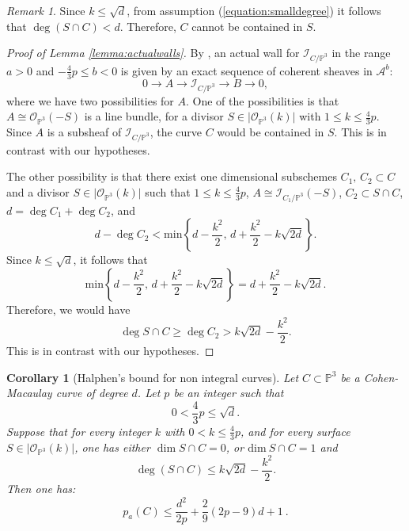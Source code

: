 \documentclass[9pt,a4paper]{amsart}
\theoremstyle{plain}
\newtheorem{corollary}[theorem]{Corollary}
\theoremstyle{definition}
\theoremstyle{remark}
\newtheorem{remark}[theorem]{Remark}
\begin{document}
\begin{remark}
Since $k\leq \sqrt{d}$, from assumption (\ref{equation:smalldegree})
it follows that $\deg(S\cap C)<d$. Therefore, $C$ cannot be
contained in $S$.
\end{remark}


\begin{proof}[Proof of Lemma \ref{lemma:actualwalls}]
By \cite[Proposition 3.2]{Liu}, an actual wall for
$\mathcal I_{C/\mathbb{P}^3} $ in the range $a> 0$ and $ - \frac{4}{3}p \le b
< 0$ is given by an exact sequence of coherent sheaves in $\mathcal
A^b$:
\begin{equation*}
0 \rightarrow A \rightarrow \mathcal I_{C/\mathbb{P}^3}\rightarrow B
\rightarrow 0,
\end{equation*}
where we have two possibilities for $A$. One of the possibilities is
that $A \cong \mathcal{O}_{\mathbb{P}^3}(-S)$ is a line bundle, for
a divisor $S \in \vert \mathcal{O}_{\mathbb{P}^3}(k) \vert$ with
$1\leq k\le \frac{4}{3}p$. Since $A$ is a subsheaf of
$\mathcal I_{C/\mathbb{P}^3}$, the curve $C$ would be contained in $S$. This
is in contrast with our hypotheses.

The other possibility is that there exist one dimensional subschemes
$C_1,\,C_2\subset C$ and a divisor $S \in \vert
\mathcal{O}_{\mathbb{P}^3}(k) \vert$ such that $1\leq k\leq
\frac{4}{3}p$, $A\cong \mathcal I_{C_1/\mathbb{P}^3}(-S)$, $C_2\subset S\cap
C$, $d = \deg C_1+\deg C_2$, and
\begin{equation*}
d - \deg C_2 < \mathrm{min}\left\{  d - \dfrac{k^2}{2},\, d +
\dfrac{k^2}{2} - k\sqrt{2d}  \right\}.
\end{equation*}
Since $k\leq \sqrt{d}$, it follows that
$$
\mathrm{min}\left\{  d - \dfrac{k^2}{2},\, d + \dfrac{k^2}{2} -
k\sqrt{2d}  \right\}=d + \dfrac{k^2}{2} - k\sqrt{2d}.
$$
Therefore, we would have
$$
\deg S\cap C\geq \deg C_2 >k\sqrt{2d}-\dfrac{k^2}{2}.
$$
This is in contrast with our hypotheses.
\end{proof}


\begin{corollary}[Halphen's bound for non integral curves]\label{Halphen2}
Let $C\subset \mathbb{P}^3$ be a Cohen-Macaulay curve of degree $d$.
Let $p$ be an integer such that
$$
0<\frac{4}{3}p\leq \sqrt{d}.
$$
Suppose that for every integer $k$ with $0<k\leq \frac{4}{3}p$, and for every surface
$S \in \vert \mathcal{O}_{\mathbb{P}^3}(k) \vert$, one has
either $\dim S\cap C=0$, or $\mathrm{dim}\ S\cap C = 1$
and
\begin{equation*}
\deg(S\cap C) \leq k\sqrt{2d}-\dfrac{k^2}{2}.
\end{equation*}
Then one has:
\begin{equation}\label{equation:halphen}
p_a(C) \le\dfrac{d^2}{2p}+ \dfrac{2}{9}(2p-9) d + 1\ .
\end{equation}
\end{corollary}
\end{document}

